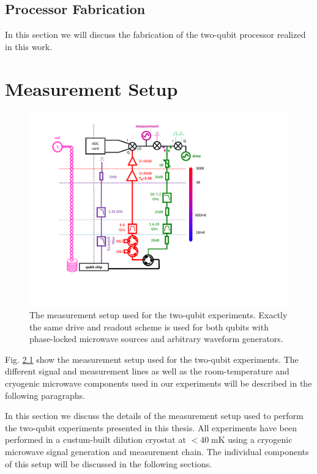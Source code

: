 \section{Processor Fabrication}

In this section we will discuss the fabrication of the two-qubit processor realized in this work.

\chapter{Measurement Setup}

\begin{figure}[ht!]
	\centering
		\includegraphics[width=1.\textwidth]{"./material/figures/2-qubit-processor/measurement setup"}
	\caption[The measurement setup used for the two-qubit experiments]{The measurement setup used for the two-qubit experiments. Exactly the same drive and readout scheme is used for both qubits with phase-locked microwave sources and arbitrary waveform generators.}
	\label{fig:MeasurementSetup}
\end{figure}

Fig. \ref{fig:MeasurementSetup} show the measurement setup used for the two-qubit experiments. The different signal and measurement lines as well as the room-temperature and cryogenic microwave components used in our experiments will be described in the following paragraphs.

In this section we discuss the details of the measurement setup used to perform the two-qubit experiments presented in this thesis. All experiments have been performed in a custum-built dilution cryostat at $< 40 \; \mathrm{mK}$ using a cryogenic microwave signal generation and measurement chain. The individual components of this setup will be discussed in the following sections.

